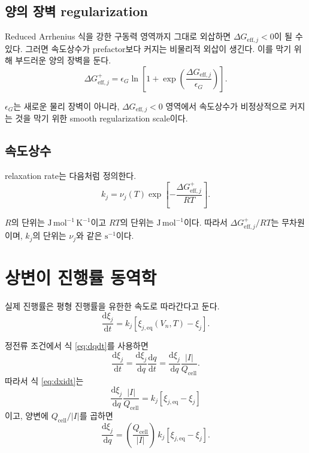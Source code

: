 \documentclass[11pt]{article}
\newcommand{\dd}{\mathrm{d}}
\newcommand{\cell}{\mathrm{cell}}
\newcommand{\eff}{\mathrm{eff}}
\begin{document}
\subsection{양의 장벽 regularization}

Reduced Arrhenius 식을 강한 구동력 영역까지 그대로 외삽하면 \(\Delta G_{\eff,j}<0\)이 될 수 있다. 그러면 속도상수가 prefactor보다 커지는 비물리적 외삽이 생긴다. 이를 막기 위해 부드러운 양의 장벽을 둔다.
\begin{equation}
\boxed{
\Delta G_{\eff,j}^{+}
=
\epsilon_G\ln\left[
1+\exp\left(\frac{\Delta G_{\eff,j}}{\epsilon_G}\right)
\right].
}
\label{eq:softplus}
\end{equation}

\(\epsilon_G\)는 새로운 물리 장벽이 아니라, \(\Delta G_{\eff,j}<0\) 영역에서 속도상수가 비정상적으로 커지는 것을 막기 위한 smooth regularization scale이다.

\subsection{속도상수}

relaxation rate는 다음처럼 정의한다.
\begin{equation}
\boxed{
k_j
=
\nu_j(T)\exp\!\left[-\frac{\Delta G_{\eff,j}^{+}}{RT}\right].
}
\label{eq:k_rate}
\end{equation}

\(R\)의 단위는 \(\mathrm{J\,mol^{-1}\,K^{-1}}\)이고 \(RT\)의 단위는 \(\mathrm{J\,mol^{-1}}\)이다. 따라서 \(\Delta G_{\eff,j}^{+}/RT\)는 무차원이며, \(k_j\)의 단위는 \(\nu_j\)와 같은 \(\mathrm{s^{-1}}\)이다.

\section{상변이 진행률 동역학}

실제 진행률은 평형 진행률을 유한한 속도로 따라간다고 둔다.
\begin{equation}
\boxed{
\frac{\dd \xi_j}{\dd t}
=
k_j\left[
\xi_{j,\mathrm{eq}}(V_n,T)-\xi_j
\right].
}
\label{eq:dxidt}
\end{equation}

정전류 조건에서 식 \eqref{eq:dqdt}를 사용하면
\begin{equation}
\frac{\dd \xi_j}{\dd t}
=
\frac{\dd \xi_j}{\dd q}
\frac{\dd q}{\dd t}
=
\frac{\dd \xi_j}{\dd q}
\frac{|I|}{Q_{\cell}} .
\end{equation}
따라서 식 \eqref{eq:dxidt}는
\begin{equation}
\frac{\dd \xi_j}{\dd q}
\frac{|I|}{Q_{\cell}}
=
k_j\left[
\xi_{j,\mathrm{eq}}-\xi_j
\right]
\end{equation}
이고, 양변에 \(Q_{\cell}/|I|\)를 곱하면
\begin{equation}
\boxed{
\frac{\dd \xi_j}{\dd q}
=
\left(\frac{Q_{\cell}}{|I|}\right)
\,k_j\left[
\xi_{j,\mathrm{eq}}-\xi_j
\right].
}
\label{eq:dxidq}
\end{equation}
\end{document}
